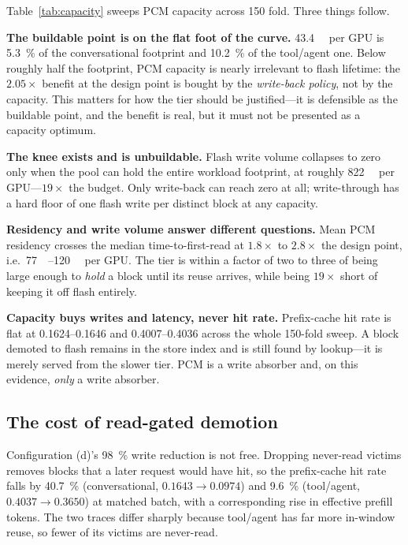 \documentclass[conference]{IEEEtran}
\newcommand{\cfgd}{\textsf{(d)}}
\begin{document}
Table~\ref{tab:capacity} sweeps PCM capacity across \num{150} fold. Three things
follow.

\textbf{The buildable point is on the flat foot of the curve.}
\SI{43.4}{\gibi\byte} per GPU is \SI{5.3}{\percent} of the conversational
footprint and \SI{10.2}{\percent} of the tool/agent one. Below roughly half the
footprint, PCM capacity is nearly irrelevant to flash lifetime: the $2.05\times$
benefit at the design point is bought by the \emph{write-back policy}, not by the
capacity. This matters for how the tier should be justified---it is defensible as
the buildable point, and the benefit is real, but it must not be presented as a
capacity optimum.

\textbf{The knee exists and is unbuildable.} Flash write volume collapses to zero
only when the pool can hold the entire workload footprint, at roughly
\SI{822}{\gibi\byte} per GPU---$19\times$ the budget. Only write-back can reach
zero at all; write-through has a hard floor of one flash write per distinct
block at any capacity.

\textbf{Residency and write volume answer different questions.} Mean PCM
residency crosses the median time-to-first-read at $1.8\times$ to
$2.8\times$ the design point, i.e.\ \SIrange{77}{120}{\gibi\byte} per GPU. The tier is within a factor of two to three of being large
enough to \emph{hold} a block until its reuse arrives, while being $19\times$
short of keeping it off flash entirely.

\textbf{Capacity buys writes and latency, never hit rate.} Prefix-cache hit rate
is flat at \numrange{0.1624}{0.1646} and \numrange{0.4007}{0.4036} across the
whole \num{150}-fold sweep. A block demoted to flash remains in the store index
and is still found by lookup---it is merely served from the slower tier. PCM is a
write absorber and, on this evidence, \emph{only} a write absorber.

\subsection{The cost of read-gated demotion}

Configuration \cfgd's \SI{98}{\percent} write reduction is not free. Dropping
never-read victims removes blocks that a later request would have hit, so the
prefix-cache hit rate falls by \SI{40.7}{\percent} (conversational,
$0.1643 \to 0.0974$) and \SI{9.6}{\percent} (tool/agent,
$0.4037 \to 0.3650$) at matched batch, with a corresponding rise in effective
prefill tokens. The two traces differ sharply because tool/agent has far more
in-window reuse, so fewer of its victims are never-read.
\end{document}
